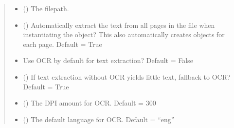 \documentclass[letterpaper,10pt,english]{sphinxmanual}
\begin{document}
\begin{fulllineitems}
\begin{sphinxVerbatim}[commandchars=\\\{\}]
\PYG{p}{[}\PYG{p}{]}
\end{sphinxVerbatim}
\begin{quote}\begin{description}
\begin{itemize}
\item {} 
\sphinxAtStartPar
{} () \textendash{} The filepath.

\item {} 
\sphinxAtStartPar
{} () \textendash{} Automatically extract the text from all pages in the
file when instantiating the object? This also automatically creates
{\hyperref[\detokenize{generated/bp_text.pdf:bp_text.pdf.PdfPage}]{}} objects for each page. Default = True

\item {} 
\sphinxAtStartPar
{} \textendash{} Use OCR by default for text extraction? Default = False

\item {} 
\sphinxAtStartPar
{} () \textendash{} If text extraction without OCR yields little text,
fallback to OCR? Default = True

\item {} 
\sphinxAtStartPar
{} () \textendash{} The DPI amount for OCR. Default = 300

\item {} 
\sphinxAtStartPar
{} () \textendash{} The default language for OCR. Default = “eng”

\end{itemize}

\end{description}\end{quote}


\end{fulllineitems}
\end{document}
